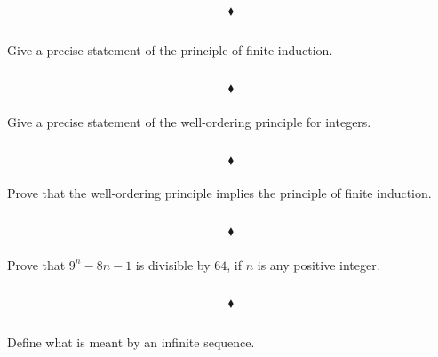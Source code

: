 $$\blacklozenge$$




\renewcommand{\thesubsection}{\thesection.\RomanNumeralCaps{7}}
\subsection{}
\subsubsection{}
\begin{tcolorbox}
Give a precise statement of the principle of finite induction.  
\end{tcolorbox}
$$ $$

$$\blacklozenge$$

\subsubsection{}
\begin{tcolorbox}
Give a precise statement of the well-ordering principle for integers. 
\end{tcolorbox}
$$ $$

$$\blacklozenge$$

\subsubsection{}
\begin{tcolorbox}
Prove that the well-ordering principle implies the principle of finite induction. 
\end{tcolorbox}
$$ $$

$$\blacklozenge$$

\subsubsection{}
\begin{tcolorbox}
 Prove that $9^n-8n-1$ is divisible by $64$, if $n$ is any positive integer. 
\end{tcolorbox}
$$ $$

$$\blacklozenge$$


\renewcommand{\thesubsection}{\thesection.\RomanNumeralCaps{8}}
\subsection{}
\subsubsection{}
\begin{tcolorbox}
Define what is meant by an infinite sequence.
\end{tcolorbox}
$$ $$


